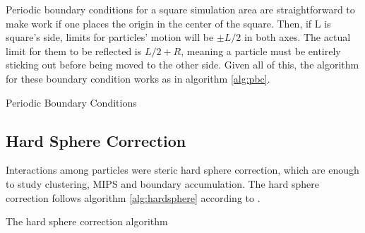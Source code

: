 \documentclass[../../master_thesis_np.tex]{subfiles}
\begin{document}
	Periodic boundary conditions for a square simulation area are straightforward to make work if one places the origin in the center of the square. Then, if L is square's side, limits for particles' motion will be $\pm L/2$ in both axes. The actual limit for them to be reflected is $L/2 + R$, meaning a particle must be entirely sticking out before being moved to the other side. Given all of this, the algorithm for these boundary condition works as in algorithm \ref{alg:pbc}.
	
	\begin{algorithm}[htp]
		\caption{Periodic Boundary Conditions} \label{alg:pbc}	
		\begin{algorithmic}[1]
			\EndIf
			\EndIf
			\EndFor
		\end{algorithmic}
	\end{algorithm}
	
	\subsection{Hard Sphere Correction}
	Interactions among particles were steric hard sphere correction, which are enough to study clustering, MIPS and boundary accumulation. The hard sphere correction follows algorithm \ref{alg:hardsphere} according to \cite{callegari_numerical_2019}.
	

	\begin{algorithm}[htp]
		\caption{The hard sphere correction algorithm} \label{alg:hardsphere}	
		\begin{algorithmic}[1]
			 

			\EndIf
			\EndFor
		\end{algorithmic}
		\end{algorithm}
\end{document}
